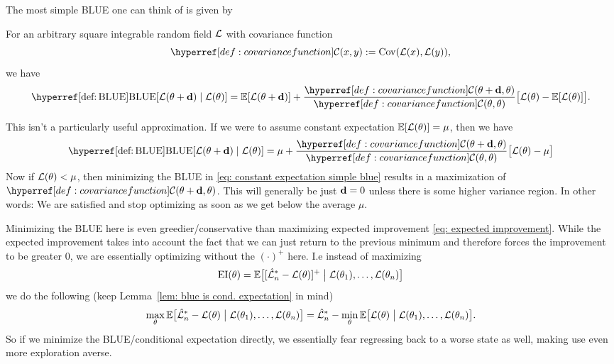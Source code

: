 The most simple BLUE one can think of is given by

\begin{lemma}\label{lem: one-step zero-order blue}
	For an arbitrary square integrable random field \(\mathcal{L}\) with covariance
	function
	\begin{equation}\label{def: covariance function}
		\C(x,y):= \Cov(\Loss(x), \Loss(y)),
	\end{equation}
	we have
	\begin{equation*}
		\BLUE[\Loss(\param + \step) \mid \Loss(\param)]
		= \E[\Loss(\param + \step)]
		+ \frac{\C(\param+\step,\param)}{\C(\param, \param)}
		\big[\Loss(\param) - \E[\Loss(\param)]\big].
	\end{equation*}
\end{lemma}

This isn't a particularly useful approximation. If we were to assume constant
expectation \(\mathbb{E}[\mathcal{L}(\theta)] = \mu\), then we have
\begin{equation}\label{eq: constant expectation simple blue}
	\BLUE[\Loss(\param + \step) \mid \Loss(\param)]
	=\mu 
	+ \frac{\C(\param+\step,\param)}{\C(\param, \param)}
	\big[\Loss(\param) - \mu\big]
\end{equation}
Now if \(\mathcal{L}(\theta) < \mu\), then minimizing the BLUE in
\eqref{eq: constant expectation simple blue} results in a maximization of
\(\C(\param+\step, \param)\). This will generally be just \(\mathbf{d}=0\) unless
there is some higher variance region. In other words: We are satisfied and
stop optimizing as soon as we get below the average \(\mu\).

Minimizing the BLUE here is even greedier/conservative than maximizing
expected improvement \eqref{eq: expected improvement}. While the expected
improvement takes into account the fact that we can just return to the previous
minimum and therefore forces the improvement to be greater \(0\), we are
essentially optimizing without the \((\cdot)^+\) here. I.e instead of
maximizing
\begin{equation*}
	\operatorname{EI}(\theta) = \mathbb{E}\big[
			[\hat{\mathcal{L}}_n^*- \mathcal{L}(\theta)]^+
			\bigm|
			\mathcal{L}(\theta_1),\dots, \mathcal{L}(\theta_n)
		\big]
\end{equation*}
we do the following (keep Lemma~\ref{lem: blue is cond. expectation} in mind)
\begin{equation*}
	\max_{\theta} \mathbb{E}\big[
		\hat{\mathcal{L}}_n^*- \mathcal{L}(\theta)
		\bigm|
		\mathcal{L}(\theta_1),\dots, \mathcal{L}(\theta_n)
	\big]
	= \hat{\mathcal{L}}_n^* - \min_{\theta} \mathbb{E}\big[
		\mathcal{L}(\theta)
		\bigm|
		\mathcal{L}(\theta_1),\dots, \mathcal{L}(\theta_n)
	\big].
\end{equation*}
So if we minimize the BLUE/conditional expectation directly, we essentially fear
regressing back to a worse state as well, making use even more exploration
averse.

